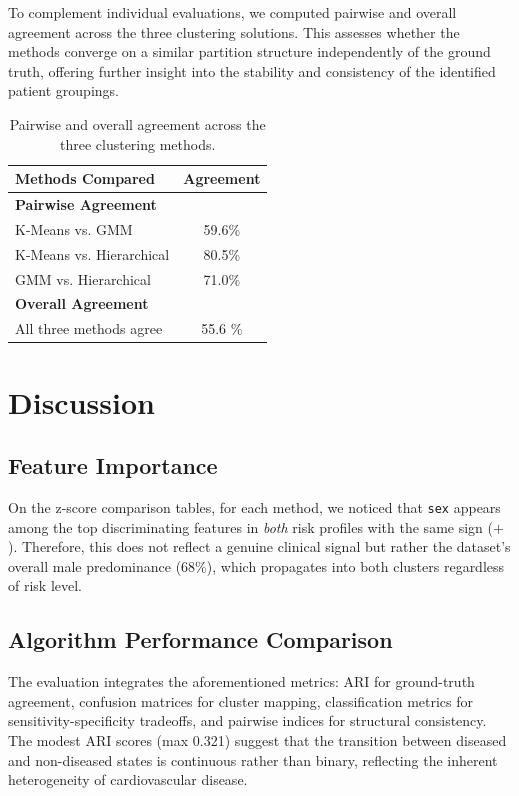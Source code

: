 \documentclass[twocolumn, fontsize=10pt]{article}
\begin{document}
To complement individual evaluations, we computed pairwise and overall agreement across the three clustering solutions. This assesses whether the methods converge on a similar partition structure independently of the ground truth, offering further insight into the stability and consistency of the identified patient groupings.

\begin{table}[H]
\centering
\small
\begin{tabular}{lc}
\toprule
\textbf{Methods Compared} & \textbf{Agreement} \\
\midrule
\textbf{Pairwise Agreement} & \\
K-Means vs. GMM          & 59.6\% \\
K-Means vs. Hierarchical & 80.5\% \\
GMM vs. Hierarchical     & 71.0\% \\
\midrule
\textbf{Overall Agreement} & \\
All three methods agree  & 55.6 \% \\
\bottomrule
\end{tabular}
\caption{Pairwise and overall agreement across the three clustering methods.}
\label{tab:method_agreement}
\end{table}


\section{Discussion}
\label{sec:discussion}

\subsection{Feature Importance}

On the z-score comparison tables, for each method, we noticed that \texttt{sex} appears among the top discriminating features in \textit{both} risk profiles with the same sign ($+$). Therefore, this does not reflect a genuine clinical signal but rather the dataset's overall male predominance (68\%), which propagates into both clusters regardless of risk level.

\subsection{Algorithm Performance Comparison}

The evaluation integrates the aforementioned metrics: ARI for ground-truth agreement, confusion matrices for cluster mapping, classification metrics for sensitivity-specificity tradeoffs, and pairwise indices for structural consistency. The modest ARI scores (max 0.321) suggest that the transition between diseased and non-diseased states is continuous rather than binary, reflecting the inherent heterogeneity of cardiovascular disease.
\end{document}
